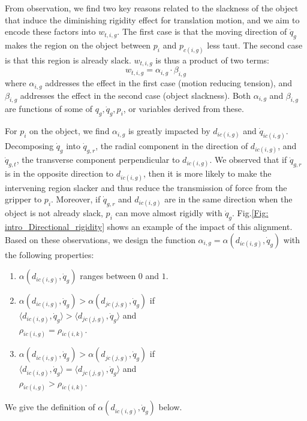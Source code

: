 From observation, we find two key reasons related to the slackness of the object that induce the diminishing rigidity effect for translation motion, and we aim to encode these factors into $w_{t,i,g}$. 
The first case is that the moving direction of $\dot{q}_g$ makes the region on the object between $p_i$ and $p_{c(i,g)}$ less taut.
The second case is that this region is already slack.
$w_{t,i,g}$ is thus a product of two terms:
\begin{equation}
w_{t,i,g} = \alpha_{i,g} \cdot \beta_{i,g}
\label{Eq: Combined_directional_rigidity}
\end{equation}
where $\alpha_{i,g}$ addresses the effect in the first case (motion reducing tension),
and $\beta_{i,g}$ addresses the effect in the second case (object slackness). 
Both $\alpha_{i,g}$ and $\beta_{i,g}$ are functions of some of $q_g, \dot{q}_g, p_i$, or variables derived from these.

For $p_i$ on the object, we find $\alpha_{i,g}$ is greatly impacted by $d_{ic(i,g)}$ and $\dot{q}_{ic(i,g)}$.
Decomposing $\dot{q}_g$ into $\dot{q}_{g,r}$, the radial component in the direction of $d_{ic(i,g)}$, and $\dot{q}_{g,t}$, the transverse component perpendicular to $d_{ic(i,g)}$. 
We observed that if $\dot{q}_{g,r}$ is in the opposite direction to $d_{ic(i,g)}$, then it is more likely to make the intervening region slacker and thus reduce the transmission of force from the gripper to $p_i$.
Moreover, if $\dot{q}_{g,r}$ and $d_{ic(i,g)}$ are in the same direction when the object is not already slack, $p_i$ can move almost rigidly with $\dot{q}_g$. 
Fig.\ref{Fig: intro_Directional_rigidity} shows an example of the impact of this alignment.      
Based on these observations, we design the function $\alpha_{i,g}=\alpha (d_{ic(i,g)},\dot{q}_g)$ with the following properties:
\begin{enumerate}
\item $\alpha (d_{ic(i,g)},\dot{q}_g)$ ranges between $0$ and $1$.
\item $\alpha (d_{ic(i,g)},\dot{q}_g) > \alpha (d_{jc(j,g)},\dot{q}_g)$ if \\ 
$\langle d_{ic(i,g)},\dot{q}_g \rangle > \langle d_{jc(j,g)},\dot{q}_g \rangle$ and \\ 
$\rho_{ic(i,g)} = \rho_{ic(i,k)}$.
\item $\alpha (d_{ic(i,g)},\dot{q}_g) > \alpha (d_{jc(j,g)},\dot{q}_g)$ if \\ 
$\langle d_{ic(i,g)},\dot{q}_g \rangle = \langle d_{jc(j,g)},\dot{q}_g \rangle$ and \\
$\rho_{ic(i,g)} > \rho_{ic(i,k)}$.
\end{enumerate}
We give the definition of $\alpha (d_{ic(i,g)},\dot{q}_g)$ below.


